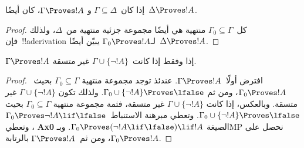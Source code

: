 \documentclass[../../../include/open-logic-section]{subfiles}
\begin{document}
      {}
      {}


\begin{prop}[الرتابة] إذا كان~$\Gamma \subseteq \Delta$ و
$\Gamma \Proves !A$، كان أيضًا~$\Delta \Proves !A$.
\end{prop}

\begin{proof}
كل~$\Gamma_0 \subseteq \Gamma$ منتهية هي أيضًا مجموعة جزئية منتهية
من~$\Delta$، ولذلك فإن~!!a{derivation} لـ$\Gamma_0 \Proves !A$ يبيّن
أيضًا~$\Delta \Proves !A$.
\end{proof}

\begin{prop}
$\Gamma \Proves !A$ إذا وفقط إذا كانت~$\Gamma\cup \{\lnot!A \}$ غير
متسقة.
\end{prop}

\begin{proof}
افترض أولًا~$\Gamma \Proves !A$. عندئذ توجد مجموعة منتهية
$\Gamma_0 \subseteq \Gamma$ بحيث~$\Gamma_0 \Proves !A$، ومن ثم
$\Gamma_0 \cup \{\lnot !A\} \Proves \lfalse$. ولذلك تكون
$\Gamma \cup \{\lnot !A\}$ غير متسقة. وبالعكس، إذا كانت
$\Gamma \cup \{\lnot !A\}$ غير متسقة، فثمة مجموعة منتهية
$\Gamma_0 \subseteq \Gamma$ بحيث
$\Gamma_0 \cup \{\lnot !A\} \Proves \lfalse$. وتعطي مبرهنة
الاستنباط~$\Gamma_0 \Proves \lnot !A \lif \lfalse$، وتعطي
\textbf{Ax0} الصيغة
$\Gamma_0 \Proves (\lnot !A \lif \lfalse) \lif !A$. وبـMP نحصل على
$\Gamma_0 \Proves !A$، ومن ثم~$\Gamma \Proves !A$ بالرتابة.
\end{proof}
\end{document}
